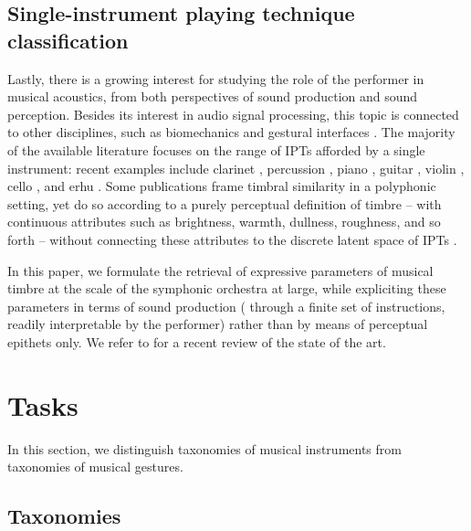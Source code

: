\subsection{Single-instrument playing technique classification}
Lastly, there is a growing interest for studying the role of the performer in musical acoustics, from both perspectives of sound production and sound perception.
Besides its interest in audio signal processing, this topic is connected to other disciplines, such as biomechanics and gestural interfaces \cite{metcalf2014frontiers}.
The majority of the available literature focuses on the range of IPTs afforded by a single instrument: recent examples include clarinet \cite{loureiro2004ismir}, percussion \cite{tindale2004ismir}, piano \cite{bernays2013smc}, guitar \cite{foulon2013cmmr,su2014ismir,chen2015ismir}, violin \cite{young2008nime}, cello \cite[chapter 6]{chudy2016phd}, and erhu \cite{yang2014fma}.
Some publications frame timbral similarity in a polyphonic setting, yet do so according to a purely perceptual definition of timbre -- with continuous attributes such as brightness, warmth, dullness, roughness, and so forth -- without connecting these attributes to the discrete latent space of IPTs \cite{antoine2018isma}.

In this paper, we formulate the retrieval of expressive parameters of musical timbre at the scale of the symphonic orchestra at large, while expliciting these parameters in terms of sound production (\ie{} through a finite set of instructions, readily interpretable by the performer) rather than by means of perceptual epithets only.
We refer to \cite{leman2017chapter} for a recent review of the state of the art.



\section{Tasks}
In this section, we distinguish taxonomies of musical instruments from taxonomies of musical gestures.

\subsection{Taxonomies}

